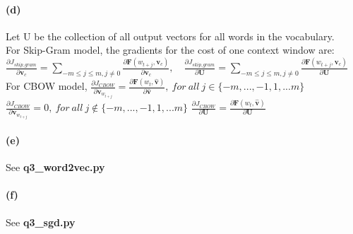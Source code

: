 \documentclass{article}
\begin{document}
\begin{spacing}{1.5}
\paragraph{(d)}Let U be the collection of all output vectors for all words in the vocabulary. \\
For Skip-Gram model, the gradients for the cost of one context window are:\newline
	$ \frac{\partial J_{skip\_gram}}{\partial \boldsymbol{v}_c}=\sum_{-m\leq j\leq m,j\neq0}\frac{\partial \boldsymbol{F}(w_{t+j},\boldsymbol{v}_c)}{\partial \boldsymbol{v}_c}, \quad 
	 \frac{\partial J_{skip\_gram}}{\partial \boldsymbol{U}}=\sum_{-m\leq j\leq m,j\neq0}\frac{\partial \boldsymbol{F}(w_{t+j},\boldsymbol{v}_c)}{\partial \boldsymbol{U}} $ \newline
For CBOW model, \newline
	$ \frac{\partial J_{CBOW}}{\partial \boldsymbol{v}_{w_{t+j}}}=\frac{\partial \boldsymbol{F}(w_{t},\boldsymbol{\widehat{v}})}{\partial \boldsymbol{\widehat{v}}}, \ for\ all\ j\in\{-m,...,-1,1,...m\} $ \newline
	$ \frac{\partial J_{CBOW}}{\partial \boldsymbol{v}_{w_{t+j}}}=0, \ for\ all\ j\notin\{-m,...,-1,1,...m\} $ \newline
	$ \frac{\partial J_{CBOW}}{\partial \boldsymbol{U}}=\frac{\partial \boldsymbol{F}(w_{t},\boldsymbol{\widehat{v}})}{\partial \boldsymbol{U}} $
\paragraph{(e)}See \textbf{q3\_word2vec.py}
\paragraph{(f)}See \textbf{q3\_sgd.py}

\end{spacing}
\end{document}

